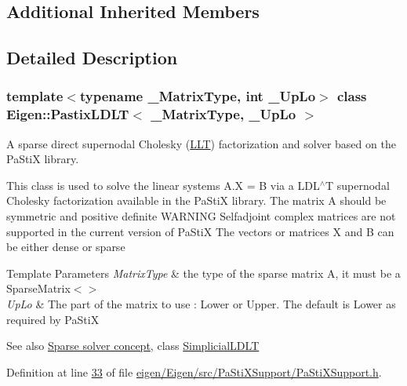 \subsection*{Additional Inherited Members}


\subsection{Detailed Description}
\subsubsection*{template$<$typename \+\_\+\+Matrix\+Type, int \+\_\+\+Up\+Lo$>$\newline
class Eigen\+::\+Pastix\+L\+D\+L\+T$<$ \+\_\+\+Matrix\+Type, \+\_\+\+Up\+Lo $>$}

A sparse direct supernodal Cholesky (\hyperlink{group___cholesky___module_class_eigen_1_1_l_l_t}{L\+LT}) factorization and solver based on the Pa\+StiX library. 

This class is used to solve the linear systems A.\+X = B via a L\+D\+L$^\wedge$T supernodal Cholesky factorization available in the Pa\+StiX library. The matrix A should be symmetric and positive definite W\+A\+R\+N\+I\+NG Selfadjoint complex matrices are not supported in the current version of Pa\+StiX The vectors or matrices X and B can be either dense or sparse


\begin{DoxyTemplParams}{Template Parameters}
{\em Matrix\+Type} & the type of the sparse matrix A, it must be a Sparse\+Matrix$<$$>$ \\
\hline
{\em Up\+Lo} & The part of the matrix to use \+: Lower or Upper. The default is Lower as required by Pa\+StiX\\
\hline
\end{DoxyTemplParams}


\begin{DoxySeeAlso}{See also}
\hyperlink{SparseLinearSystems.dox_TutorialSparseSolverConcept}{Sparse solver concept}, class \hyperlink{group___sparse_cholesky___module_class_eigen_1_1_simplicial_l_d_l_t}{Simplicial\+L\+D\+LT} 
\end{DoxySeeAlso}


Definition at line \hyperlink{eigen_2_eigen_2src_2_pa_sti_x_support_2_pa_sti_x_support_8h_source_l00033}{33} of file \hyperlink{eigen_2_eigen_2src_2_pa_sti_x_support_2_pa_sti_x_support_8h_source}{eigen/\+Eigen/src/\+Pa\+Sti\+X\+Support/\+Pa\+Sti\+X\+Support.\+h}.



